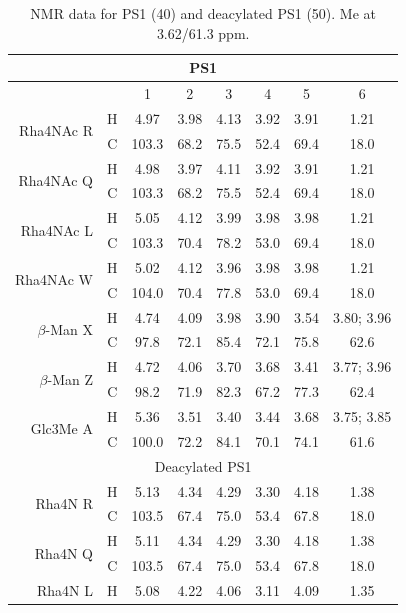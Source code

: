 		\begin{table}[h]  %
			\centering
			\caption{\Ac{NMR} data for \caulobacter \ac{PS}1 (40\cel) and deacylated \ac{PS}1 (50\cel). Me at 3.62/61.3 ppm.}
			\label{tbl:lpsops}
			\begin{tabular}{@{}rccccccc@{}}
				\toprule
				\multicolumn{8}{c}{PS1} \\ \midrule
				 &  & 1 & 2 & 3 & 4 & 5 & 6 \\ \midrule
				\multirow{2}{*}{Rha4NAc R} & H & 4.97 & 3.98 & 4.13 & 3.92 & 3.91 & 1.21 \\
				 & C & 103.3 & 68.2 & 75.5 & 52.4 & 69.4 & 18.0 \\
				\multirow{2}{*}{Rha4NAc Q} & H & 4.98 & 3.97 & 4.11 & 3.92 & 3.91 & 1.21 \\
				 & C & 103.3 & 68.2 & 75.5 & 52.4 & 69.4 & 18.0 \\
				\multirow{2}{*}{Rha4NAc L} & H & 5.05 & 4.12 & 3.99 & 3.98 & 3.98 & 1.21 \\
				 & C & 103.3 & 70.4 & 78.2 & 53.0 & 69.4 & 18.0 \\
				\multirow{2}{*}{Rha4NAc W} & H & 5.02 & 4.12 & 3.96 & 3.98 & 3.98 & 1.21 \\
				 & C & 104.0 & 70.4 & 77.8 & 53.0 & 69.4 & 18.0 \\
				\multirow{2}{*}{$\beta$-Man X} & H & 4.74 & 4.09 & 3.98 & 3.90 & 3.54 & 3.80; 3.96 \\
				 & C & 97.8 & 72.1 & 85.4 & 72.1 & 75.8 & 62.6 \\
				\multirow{2}{*}{$\beta$-Man Z} & H & 4.72 & 4.06 & 3.70 & 3.68 & 3.41 & 3.77; 3.96 \\
				 & C & 98.2 & 71.9 & 82.3 & 67.2 & 77.3 & 62.4 \\
				\multirow{2}{*}{Glc3Me A} & H & 5.36 & 3.51 & 3.40 & 3.44 & 3.68 & 3.75; 3.85 \\
				 & C & 100.0 & 72.2 & 84.1 & 70.1 & 74.1 & 61.6 \\ \midrule
				\multicolumn{8}{c}{Deacylated PS1} \\ \midrule
				\multirow{2}{*}{Rha4N R} & H & 5.13 & 4.34 & 4.29 & 3.30 & 4.18 & 1.38 \\
				 & C & 103.5 & 67.4 & 75.0 & 53.4 & 67.8 & 18.0 \\
				\multirow{2}{*}{Rha4N Q} & H & 5.11 & 4.34 & 4.29 & 3.30 & 4.18 & 1.38 \\
				 & C & 103.5 & 67.4 & 75.0 & 53.4 & 67.8 & 18.0 \\
				\multirow{2}{*}{Rha4N L} & H & 5.08 & 4.22 & 4.06 & 3.11 & 4.09 & 1.35 \\

\end{tabular}
\end{table}

